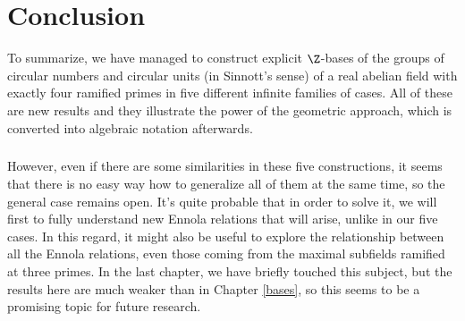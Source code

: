 \chapter*{Conclusion}

To summarize, we have managed to construct explicit $\Z$-bases of the groups of circular numbers and circular units (in Sinnott's sense) of a real abelian field with exactly four ramified primes in five different infinite families of cases. All of these are new results and they illustrate the power of the geometric approach, which is converted into algebraic notation afterwards. 
\paragraph*{}
However, even if there are some similarities in these five constructions, it seems that there is no easy way how to generalize all of them at the same time, so the general case remains open. It's quite probable that in order to solve it, we will first to fully understand new Ennola relations that will arise, unlike in our five cases. In this regard, it might also be useful to explore the relationship between all the Ennola relations, even those coming from the maximal subfields ramified at three primes. In the last chapter, we have briefly touched this subject, but the results here are much weaker than in Chapter \ref{bases}, so this seems to be a promising topic for future research.


